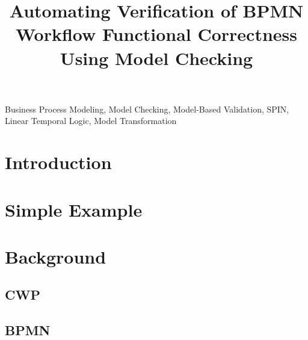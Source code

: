 \documentclass[conference]{IEEEtran}
\begin{document}
\title{
  Automating Verification of BPMN Workflow Functional Correctness Using Model Checking
}

\author{
\and
{}
}

\maketitle

\begin{abstract}
    
\end{abstract}

\begin{IEEEkeywords}
    Business Process Modeling, Model Checking, Model-Based Validation, SPIN, Linear Temporal Logic, Model Transformation
\end{IEEEkeywords}

\section{Introduction}


\section{Simple Example}
\label{sec:simpleExample}


\section{Background}
\label{sec:background}


\subsection{CWP}
\label{sec:backgroundCWP}


\subsection{BPMN}
\label{sec:backgroundBPMN}

\end{document}
